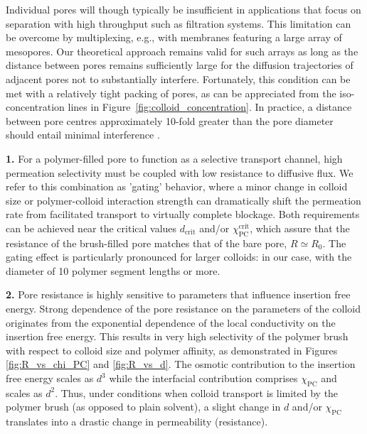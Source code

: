 \documentclass[12pt, a4paper]{article}
\begin{document}
Individual pores will though typically be insufficient in applications that focus on separation with high throughput such as filtration systems.
This limitation can be overcome by multiplexing, e.g., with membranes featuring a large array of mesopores.
Our theoretical approach remains valid for such arrays as long as the distance between pores remains sufficiently large for the diffusion trajectories of adjacent pores not to substantially interfere.
Fortunately, this condition can be met with a relatively tight packing of pores, as can be appreciated from the iso-concentration lines in Figure~\ref{fig:colloid_concentration}.
In practice, a distance between pore centres approximately 10-fold greater than the pore diameter should entail minimal interference \cite{Fabrikant1985}.

\bigskip


\textbf{1.}
For a polymer-filled pore to function as a selective transport channel, high permeation selectivity must be coupled with low resistance to diffusive flux.
We refer to this combination as 'gating' behavior, where a minor change in colloid size or polymer-colloid interaction strength can dramatically shift the permeation rate from facilitated transport to virtually complete blockage.
Both requirements can be achieved near the critical values $d_{\text{crit}}$ and/or $\chi_{\text{PC}}^{\text{crit}}$, which assure that the resistance of the brush-filled pore matches that of the bare pore, $R\simeq R_{0}$.
The gating effect is particularly pronounced for larger colloids: in our case, with the diameter of 10 polymer segment lengths or more.

\textbf{2.}
Pore resistance is highly sensitive to parameters that influence insertion free energy.
Strong dependence of the pore resistance on the parameters of the colloid originates from the exponential dependence of the local conductivity on the insertion free energy.
This results in very high selectivity of the polymer brush with respect to colloid size and polymer affinity, as demonstrated in Figures \ref{fig:R_vs_chi_PC} and \ref{fig:R_vs_d}.
The osmotic contribution to the insertion free energy scales as $d^3$ while the interfacial contribution comprises $\chi_{\text{PC}}$ and scales as $d^2$.
Thus, under conditions when colloid transport is limited by the polymer brush (as opposed to plain solvent), a slight change in $d$ and/or $\chi_{\text{PC}}$ translates into a drastic change in permeability (resistance).
\end{document}
